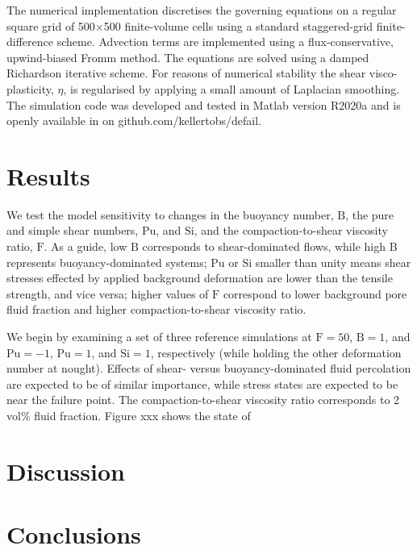 \documentclass[12pt,a4paper]{article}
\begin{document}
The numerical implementation discretises the governing equations on a regular square grid of 500$\times$500 finite-volume cells using a standard staggered-grid finite-difference scheme. Advection terms are implemented using a flux-conservative, upwind-biased Fromm method. The equations are solved using a damped Richardson iterative scheme. For reasons of numerical stability the shear visco-plasticity, $\eta$, is regularised by applying a small amount of Laplacian smoothing. 
The simulation code was developed and tested in Matlab version R2020a and is openly available in on github.com/kellertobs/defail.


\section{Results}
We test the model sensitivity to changes in the buoyancy number, $\mathrm{B}$, the  pure and simple shear numbers, $\mathrm{Pu}$, and $\mathrm{Si}$, and the compaction-to-shear viscosity ratio, $\mathrm{F}$. As a guide, low $\mathrm{B}$ corresponds to shear-dominated flows, while high $\mathrm{B}$ represents buoyancy-dominated systems; $\mathrm{Pu}$ or $\mathrm{Si}$ smaller than unity means shear stresses effected by applied background deformation are lower than the tensile strength, and vice versa; higher values of $\mathrm{F}$ correspond to lower background pore fluid fraction and higher compaction-to-shear viscosity ratio.

We begin by examining a set of three reference simulations at $\mathrm{F} = 50$, $\mathrm{B} = 1$, and $\mathrm{Pu} = -1$, $\mathrm{Pu} = 1$, and $\mathrm{Si} = 1$, respectively (while holding the other deformation number at nought). Effects of shear- versus buoyancy-dominated fluid percolation are expected to be of similar importance, while stress states are expected to be near the failure point. The compaction-to-shear viscosity ratio corresponds to 2 vol\% fluid fraction. Figure xxx shows the state of 

\section{Discussion}

\section{Conclusions}
\end{document}
